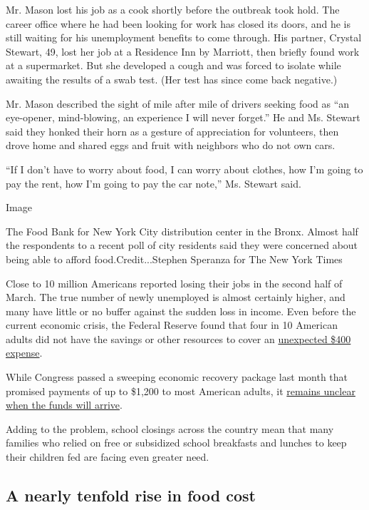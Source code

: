 Mr. Mason lost his job as a cook shortly before the outbreak took hold.
The career office where he had been looking for work has closed its
doors, and he is still waiting for his unemployment benefits to come
through. His partner, Crystal Stewart, 49, lost her job at a Residence
Inn by Marriott, then briefly found work at a supermarket. But she
developed a cough and was forced to isolate while awaiting the results
of a swab test. (Her test has since come back negative.)

Mr. Mason described the sight of mile after mile of drivers seeking food
as ``an eye-opener, mind-blowing, an experience I will never forget.''
He and Ms. Stewart said they honked their horn as a gesture of
appreciation for volunteers, then drove home and shared eggs and fruit
with neighbors who do not own cars.

``If I don't have to worry about food, I can worry about clothes, how
I'm going to pay the rent, how I'm going to pay the car note,'' Ms.
Stewart said.

Image

The Food Bank for New York City distribution center in the Bronx. Almost
half the respondents to a recent poll of city residents said they were
concerned about being able to afford food.Credit...Stephen Speranza for
The New York Times

Close to 10 million Americans reported losing their jobs in the second
half of March. The true number of newly unemployed is almost certainly
higher, and many have little or no buffer against the sudden loss in
income. Even before the current economic crisis, the Federal Reserve
found that four in 10 American adults did not have the savings or other
resources to cover an
\href{https://www.nytimes3xbfgragh.onion/2019/05/23/business/economy/fed-400-dollar-survey.html}{unexpected
\$400 expense}.

While Congress passed a sweeping economic recovery package last month
that promised payments of up to \$1,200 to most American adults, it
\href{https://www.nytimes3xbfgragh.onion/article/coronavirus-stimulus-package-questions-answers.html}{remains
unclear when the funds will arrive}.

Adding to the problem, school closings across the country mean that many
families who relied on free or subsidized school breakfasts and lunches
to keep their children fed are facing even greater need.

\hypertarget{a-nearly-tenfold-rise-in-food-cost}{%
\subsection{A nearly tenfold rise in food
cost}\label{a-nearly-tenfold-rise-in-food-cost}}

